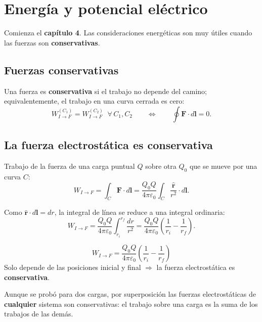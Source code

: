 \documentclass[12pt,a4paper]{article}
\begin{document}
\section{Energía y potencial eléctrico}

Comienza el \textbf{capítulo 4}. Las consideraciones energéticas son
muy útiles cuando las fuerzas son \textbf{conservativas}.

\subsection{Fuerzas conservativas}

Una fuerza es \textbf{conservativa} si el trabajo no depende del camino;
equivalentemente, el trabajo en una curva cerrada es cero:
\[
W_{I\to F}^{(C_1)} = W_{I\to F}^{(C_2)} \;\;\forall\, C_1,C_2
\qquad\Longleftrightarrow\qquad
\oint \mathbf{F}\cdot d\mathbf{l} = 0 .
\]

\subsection{La fuerza electrostática es conservativa}

Trabajo de la fuerza de una carga puntual $Q$ sobre otra $Q_0$ que se
mueve por una curva $C$:
\[
W_{I\to F} = \int_C \mathbf{F}\cdot d\mathbf{l}
= \frac{Q_0 Q}{4\pi\varepsilon_0}\int_C \frac{\hat{\mathbf{r}}}{r^2}\cdot d\mathbf{l} .
\]

Como $\hat{\mathbf{r}}\cdot d\mathbf{l} = dr$, la integral de línea se
reduce a una integral ordinaria:
\[
W_{I\to F} = \frac{Q_0 Q}{4\pi\varepsilon_0}\int_{r_i}^{r_f}\frac{dr}{r^2}
= \frac{Q_0 Q}{4\pi\varepsilon_0}\left(\frac{1}{r_i}-\frac{1}{r_f}\right).
\]



\begin{keybox}
  \[
  \boxed{W_{I\to F}
    = \frac{Q_0 Q}{4\pi\varepsilon_0}\left(\frac{1}{r_i}-\frac{1}{r_f}\right)}
  \]
  Solo depende de las posiciones inicial y final $\Rightarrow$ la fuerza
  electrostática es \textbf{conservativa}.
\end{keybox}

\begin{notebox}
  Aunque se probó para dos cargas, por superposición las fuerzas
  electrostáticas de \textbf{cualquier} sistema son conservativas: el
  trabajo sobre una carga es la suma de los trabajos de las demás.
\end{notebox}
\end{document}
